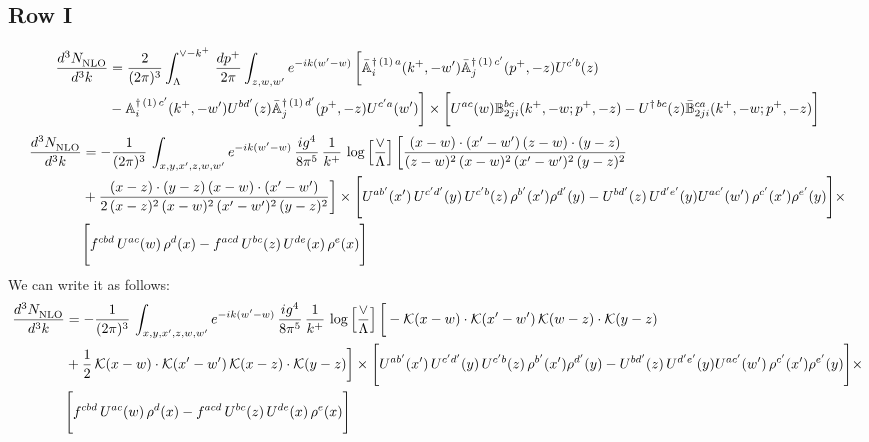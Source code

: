 \documentclass[9pt]{article}
\def\mf#1{\mathbb{#1}}
\numberwithin{equation}{section}
\begin{document}
\subsection{Row I}
\begin{align}
 \frac{d^{3}N_{\rm NLO}^{\rm}}{d^{3}k}  & =    \frac{2}{(2\pi)^{3}} \int_{\Lambda}^{\vee - k^{+}}\, \frac{dp^{+}}{2\pi}\int_{z,w,w^{\prime}} e^{-ik(w^{\prime}-w)}\, 
        \bigg[\Bar{\mf{A}}^{\dagger\, (1)\, a}_{i}(k^{+},-w^{\prime})\Bar{\mf{A}}^{\dagger\, (1)\, c^{\prime}}_{j}(p^{+},-z)U^{c^{\prime}b}(z)\notag \\ & -\mf{A}^{\dagger\, (1)\, c^{\prime}}_{i}(k^{+},- w^{\prime})U^{bd^{\prime}}(z)\Bar{\mf{A}}^{\dagger\, (1)\, d^{\prime}}_{j}(p^{+},-z)U^{c^{\prime}a}(w^{\prime})  \bigg]\times \bigg[U^{ac}(w) \mf{B}^{bc}_{2ji}(k^{+},-w;p^{+},-z) -U^{\dagger\, bc}(z)\Bar{\mf{B}}^{ca}_{2ji}(k^{+},-w; p^{+},-z)\bigg] \nonumber
\end{align}
\begin{align}
    \frac{d^{3}N_{\rm NLO}^{\rm}}{d^{3}k}  & = -\frac{1}{(2\pi)^{3}}\, \int_{x,y,x',z,w,w^{\prime}} e^{-ik(w^{\prime}-w)}\,\frac{ig^{4}}{8\pi^{5}}\,\frac{1}{k^{+}}\,\log{\left[\frac{\vee}{\Lambda}\right]}\,\bigg[\frac{(x-w)\cdot (x'-w')\,(z-w)\cdot (y-z)}{(z-w)^{2}\,(x-w)^{2}\,(x'-w')^{2}\,(y-z)^{2}}\notag \\ & +\frac{(x-z)\cdot (y-z)\,(x-w)\cdot (x'-w')}{2\,(x-z)^{2}\, (x-w)^{2}\,(x'-w')^{2}\,(y-z)^{2}}\bigg]\times  \Bigg[U^{ab'}(x')\,U^{c'd'}(y)\,U^{c'b}(z)\,\rho^{b'}(x')\rho^{d'}(y)-U^{bd'}(z)\,U^{d'e'}(y)U^{ac'}(w')\,\rho^{c'}(x')\rho^{e'}(y)\Bigg]\times\notag \\ & \Bigg[f^{cbd}\,U^{ac}(w)\,\rho^{d}(x)-f^{acd}\, U^{bc}(z)\,U^{de}(x)\,\rho^{e}(x)\Bigg] 
\end{align}
We can write it as follows: 
\begin{align}
    \frac{d^{3}N_{\rm NLO}^{\rm}}{d^{3}k}  & = -\frac{1}{(2\pi)^{3}}\, \int_{x,y,x',z,w,w^{\prime}} e^{-ik(w^{\prime}-w)}\,\frac{ig^{4}}{8\pi^{5}}\,\frac{1}{k^{+}}\,\log{\left[\frac{\vee}{\Lambda}\right]}\,\bigg[-\mathcal{K}(x-w)\cdot \mathcal{K}(x'-w')\, \mathcal{K}(w-z)\cdot \mathcal{K}(y-z)\notag \\ & +\frac{1}{2}\,\mathcal{K}(x-w)\cdot \mathcal{K}(x'-w')\, \mathcal{K}(x-z)\cdot \mathcal{K}(y-z)\bigg]\times  \Bigg[U^{ab'}(x')\,U^{c'd'}(y)\,U^{c'b}(z)\,\rho^{b'}(x')\rho^{d'}(y)-U^{bd'}(z)\,U^{d'e'}(y)U^{ac'}(w')\,\rho^{c'}(x')\rho^{e'}(y)\Bigg]\times\notag \\ & \Bigg[f^{cbd}\,U^{ac}(w)\,\rho^{d}(x)-f^{acd}\, U^{bc}(z)\,U^{de}(x)\,\rho^{e}(x)\Bigg] 
\end{align}
\end{document}

